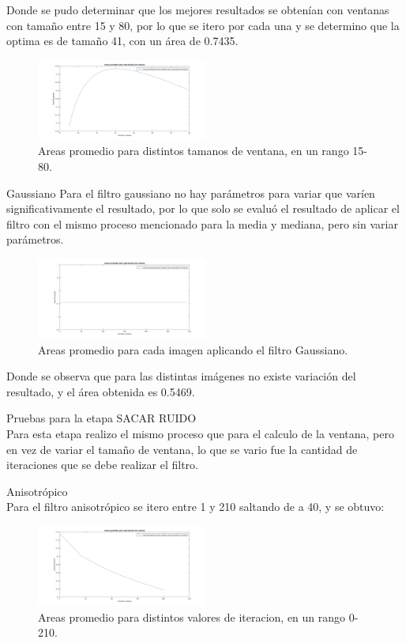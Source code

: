Donde se pudo determinar que los mejores resultados se obtenían con ventanas con tamaño entre 15 y 80, por lo que se itero por cada una y se determino que la optima es de tamaño 41, con un área de 0.7435.

\begin{figure}[h]
	{
	\centering
	\includegraphics[width=0.50\textwidth]{Figures/MediaRangoChico}
	\caption[An Electron]{Areas promedio para distintos tamanos de ventana, en un rango 15-80.}
	}
\end{figure}

Gaussiano 
Para el filtro gaussiano no hay parámetros para variar que varíen significativamente el resultado, por lo que solo se evaluó el resultado de aplicar el filtro con el mismo proceso mencionado para la media y mediana, pero sin variar parámetros. 

\begin{figure}[h]
	{
	\centering
	\includegraphics[width=0.50\textwidth]{Figures/Gaussiano}
	\caption[An Electron]{Areas promedio para cada imagen aplicando el filtro Gaussiano.}
	}
\end{figure}

Donde se observa que para las distintas imágenes no existe variación del resultado, y el área obtenida es 0.5469.


Pruebas para la etapa SACAR  RUIDO\\
Para esta etapa realizo el mismo proceso   que para el calculo de la ventana, pero en vez de variar el tamaño de ventana,  lo que se vario fue la cantidad de iteraciones que se debe realizar el filtro. 


Anisotrópico\\
Para el filtro anisotrópico se itero entre 1 y 210 saltando de a 40, y se obtuvo:

\begin{figure}[h]
	{
	\centering
	\includegraphics[width=0.50\textwidth]{Figures/AnisotropicoRangoGrande}
	\caption[An Electron]{Areas promedio para distintos valores de iteracion, en un rango 0-210.}
	}
\end{figure}

